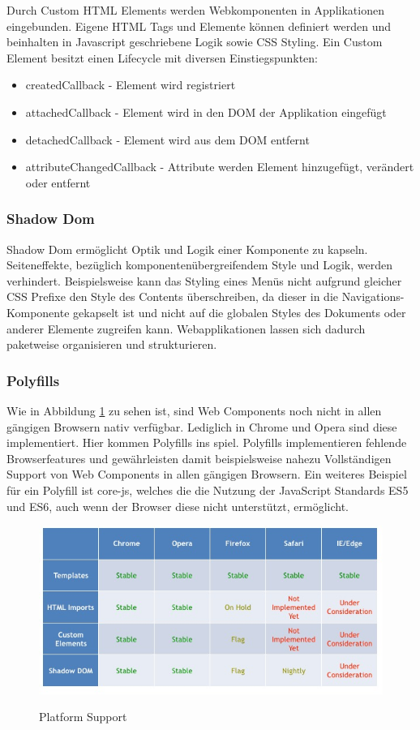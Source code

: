 Durch Custom HTML Elements werden Webkomponenten in Applikationen eingebunden.
Eigene HTML Tags und Elemente können definiert werden und beinhalten in Javascript geschriebene Logik sowie CSS Styling.
Ein Custom Element besitzt einen Lifecycle mit diversen Einstiegspunkten:

\begin{itemize}
\item createdCallback - Element wird registriert
\item attachedCallback - Element wird in den DOM der Applikation eingefügt
\item detachedCallback - Element wird aus dem DOM entfernt
\item attributeChangedCallback - Attribute werden Element hinzugefügt, verändert oder entfernt
\end{itemize}


\subsubsection{Shadow Dom}
Shadow Dom ermöglicht Optik und Logik einer Komponente zu kapseln.
Seiteneffekte, bezüglich komponentenübergreifendem Style und Logik, werden verhindert.
Beispielsweise kann das Styling eines Menüs nicht aufgrund gleicher CSS Prefixe den Style des Contents überschreiben,
da dieser in die Navigations-Komponente gekapselt ist und nicht auf die globalen Styles des Dokuments oder anderer Elemente zugreifen kann.
Webapplikationen lassen sich dadurch paketweise organisieren und strukturieren.

\subsubsection{Polyfills}

Wie in Abbildung \ref{fig:platform_support} zu sehen ist, sind Web Components noch nicht in
allen gängigen Browsern nativ verfügbar. Lediglich in Chrome und Opera sind diese implementiert.
Hier kommen Polyfills ins spiel. Polyfills implementieren fehlende Browserfeatures und gewährleisten damit beispielsweise nahezu Vollständigen
Support von Web Components in allen gängigen Browsern. Ein weiteres Beispiel für ein Polyfill ist core-js,
welches die die Nutzung der JavaScript Standards ES5 und ES6, auch wenn der Browser diese nicht unterstützt, ermöglicht.

\vspace{1cm}
\begin{figure}[ht]
 \centering
 \includegraphics[width=0.8\linewidth]{kapitel2/platform_support.jpg}
 \caption{Platform Support}\cite{WebCo43:online}
 \label{fig:platform_support}
\end{figure}


